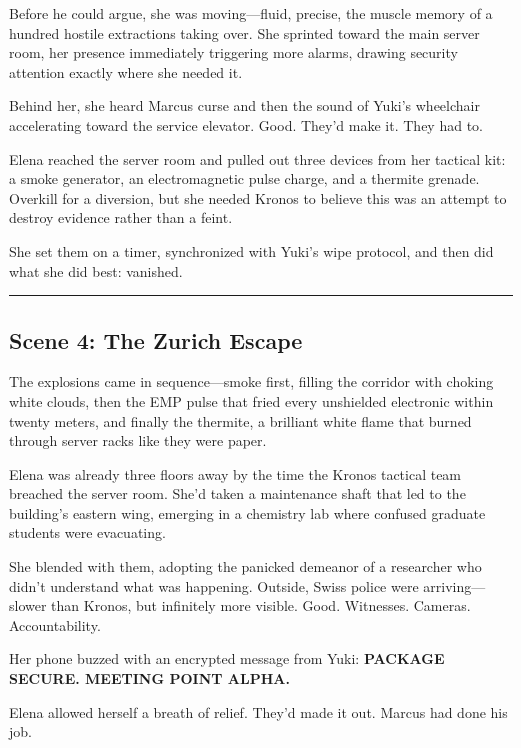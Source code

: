 \documentclass[12pt,letterpaper]{book}
\begin{document}
Before he could argue, she was moving---fluid, precise, the muscle memory of a hundred hostile extractions taking over. She sprinted toward the main server room, her presence immediately triggering more alarms, drawing security attention exactly where she needed it.

Behind her, she heard Marcus curse and then the sound of Yuki's wheelchair accelerating toward the service elevator. Good. They'd make it. They had to.

Elena reached the server room and pulled out three devices from her tactical kit: a smoke generator, an electromagnetic pulse charge, and a thermite grenade. Overkill for a diversion, but she needed Kronos to believe this was an attempt to destroy evidence rather than a feint.

She set them on a timer, synchronized with Yuki's wipe protocol, and then did what she did best: vanished.

\begin{center}\rule{0.5\linewidth}{0.5pt}\end{center}

\hypertarget{scene-4-the-zurich-escape}{%
\subsection{Scene 4: The Zurich Escape}\label{scene-4-the-zurich-escape}}

The explosions came in sequence---smoke first, filling the corridor with choking white clouds, then the EMP pulse that fried every unshielded electronic within twenty meters, and finally the thermite, a brilliant white flame that burned through server racks like they were paper.

Elena was already three floors away by the time the Kronos tactical team breached the server room. She'd taken a maintenance shaft that led to the building's eastern wing, emerging in a chemistry lab where confused graduate students were evacuating.

She blended with them, adopting the panicked demeanor of a researcher who didn't understand what was happening. Outside, Swiss police were arriving---slower than Kronos, but infinitely more visible. Good. Witnesses. Cameras. Accountability.

Her phone buzzed with an encrypted message from Yuki: \textbf{PACKAGE SECURE. MEETING POINT ALPHA.}

Elena allowed herself a breath of relief. They'd made it out. Marcus had done his job.
\end{document}
